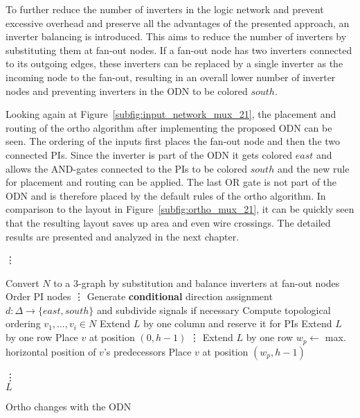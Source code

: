 To further reduce the number of inverters in the logic network and prevent excessive overhead and preserve all the advantages of the presented approach, an inverter balancing is introduced. This aims to reduce the number of inverters by substituting them at fan-out nodes. If a fan-out node has two inverters connected to its outgoing edges, these inverters can be replaced by a single inverter as the incoming node to the fan-out, resulting in an overall lower number of inverter nodes and preventing inverters in the ODN to be colored $south$.

Looking again at Figure~\ref{subfig:input_network_mux_21}, the placement and routing of the ortho algorithm after implementing the proposed ODN can be seen. The ordering of the inputs first places the fan-out node and then the two connected PIs. Since the inverter is part of the ODN it gets colored $east$ and allows the AND-gates connected to the PIs to be colored $south$ and the new rule for placement and routing can be applied. The last OR gate is not part of the ODN and is therefore placed by the default rules of the ortho algorithm. In comparison to the layout in Figure~\ref{subfig:ortho_mux_21}, it can be quickly seen that the resulting layout saves up area and even wire crossings. The detailed results are presented and analyzed in the next chapter.

\begin{algorithm}[t!]
	\vdots
	
	\begin{algorithmic}
		\State Convert $N$ to a 3-graph by substitution and balance inverters at fan-out nodes
		\State Order PI nodes
		\State \vdots
		\State Generate \textbf{conditional} direction assignment $d : \Delta \rightarrow \{east, south\}$ and subdivide signals if necessary
		\State Compute topological ordering $v_1, . . . , v_i \in N$
		\State Extend $L$ by one column and reserve it for PIs
		\State Extend $L$ by one row
		\State Place $v$ at position $(0, h - 1)$
		\State \vdots
		\State Extend $L$ by one row
		\EndIf
		\State $w_p \leftarrow$ max. horizontal position of $v$'s predecessors
		\State Place $v$ at position $(w _p, h - 1)$
		\EndIf
		
		\EndFor
		\State \vdots \\
		\Return $L$
	\end{algorithmic}
	\caption{Ortho changes with the ODN}\label{alg:input_network}
\end{algorithm}

